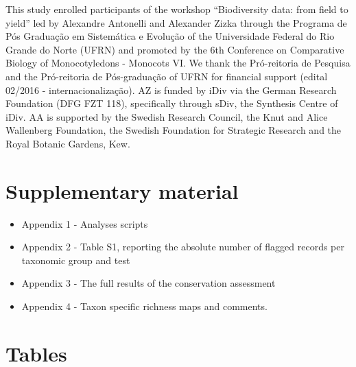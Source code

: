 \documentclass[fleqn,10pt,lineno]{wlpeerj} %
\begin{document}
This study enrolled participants of the workshop ``Biodiversity data: from field to yield'' led by Alexandre Antonelli and Alexander Zizka through the Programa de Pós Graduação em Sistemática e Evolução of the Universidade Federal do Rio Grande do Norte (UFRN) and promoted by the 6th Conference on Comparative Biology of Monocotyledons - Monocots VI. We thank the Pró-reitoria de Pesquisa and the Pró-reitoria de Pós-graduação of UFRN for financial support (edital 02/2016 - internacionalização). AZ is funded by iDiv via the German Research Foundation (DFG FZT 118), specifically through sDiv, the Synthesis Centre of iDiv. AA is supported by the Swedish Research Council, the Knut and Alice Wallenberg Foundation, the Swedish Foundation for Strategic Research and the Royal Botanic Gardens, Kew.

\hypertarget{supplementary-material}{%
\section*{Supplementary material}\label{supplementary-material}}

\begin{itemize}
\item
  Appendix 1 - Analyses scripts
\item
  Appendix 2 - Table S1, reporting the absolute number of flagged records per taxonomic group and test
\item
  Appendix 3 - The full results of the conservation assessment
\item
  Appendix 4 - Taxon specific richness maps and comments.
\end{itemize}

\hypertarget{tables}{%
\section*{Tables}\label{tables}}
\end{document}
